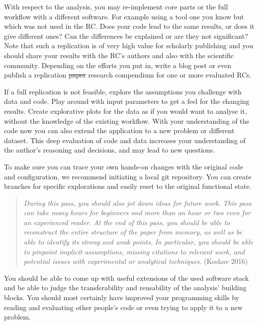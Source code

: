 \documentclass[fleqn,10pt]{wlpeerj} %
\begin{document}
With respect to the analysis, you may re-implement core parts or the
full workflow with a different software. For example using a tool one
you know but which was not used in the RC. Does your code lead to the
same results, or does it give different ones? Can the differences be
explained or are they not significant? Note that such a replication is
of very high value for scholarly publishing and you should share your
results with the RC's authors and also with the scientific community.
Depending on the efforts you put in, write a blog post or even publish a
replication \sout{paper} research compendium for one or more evaluated
RCs.

If a full replication is not feasible, explore the assumptions you
challenge with data and code. Play around with input parameters to get a
feel for the changing results. Create explorative plots for the data as
if you would want to analyse it, without the knowledge of the existing
workflow. With your understanding of the code now you can also extend
the application to a new problem or different dataset. This deep
evaluation of code and data increases your understanding of the author's
reasoning and decisions, and may lead to new questions.

To make sure you can trace your own hands-on changes with the original
code and configuration, we recommend initiating a local git repository.
You can create branches for specific explorations and easily reset to
the original functional state.

\begin{quote}
\emph{During this pass, you should also jot down ideas for future work.}
\emph{This pass can take many hours for beginners and more than an hour
or two even for an experienced reader.} \emph{At the end of this pass,
you should be able to reconstruct the entire structure of the paper from
memory, as well as be able to identify its strong and weak points.}
\emph{In particular, you should be able to pinpoint implicit
assumptions, missing citations to relevant work, and potential issues
with experimental or analytical techniques.} (Keshav 2016)
\end{quote}

You should be able to come up with useful extensions of the used
software stack and be able to judge the transferability and reusability
of the analysis' building blocks. You should most certainly have
improved your programming skills by reading and evaluating other
people's code or even trying to apply it to a new problem.
\end{document}
